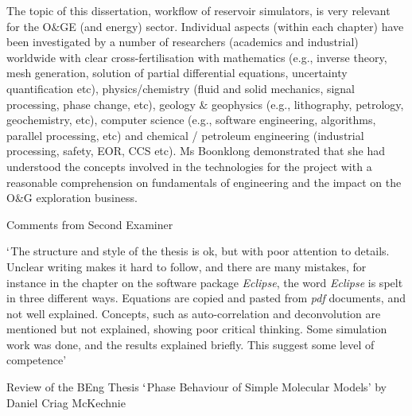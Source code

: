 \documentclass[14pt,twoside]{report}
\begin{document}
The topic of this dissertation, workflow of reservoir simulators, is very relevant for the O$\&$GE (and energy) sector.  Individual aspects (within each chapter) have been investigated by a number of researchers (academics and industrial) worldwide with clear cross-fertilisation with mathematics (e.g., inverse theory, mesh generation, solution of partial differential equations, uncertainty quantification etc), physics/chemistry (fluid and solid mechanics, signal processing, phase change, etc), geology $\&$ geophysics (e.g., lithography, petrology, geochemistry, etc), computer science (e.g., software engineering, algorithms, parallel processing, etc) and chemical / petroleum engineering (industrial processing, safety, EOR, CCS etc). Ms Boonklong  demonstrated that she had understood the concepts involved in the technologies for the project with a reasonable comprehension on fundamentals of engineering and the impact on  the O$\&$G exploration business.   


\bigskip

\noindent
{\large Comments from Second Examiner}

\noindent
$\lq$The structure and style of the thesis is ok, but with poor attention to details. Unclear writing makes it hard to follow, and there are many mistakes, for instance in the chapter on the software package {\it Eclipse}, the word {\it Eclipse} is spelt in three different ways.  Equations are copied and pasted from {\it pdf} documents, and not well explained.  Concepts, such as auto-correlation and deconvolution are mentioned but not explained, showing poor critical thinking. Some simulation work was done, and the results explained briefly. This suggest some level of competence' 



\clearpage



\bigskip

\begin{center}
  {\Large Review of the BEng Thesis $\lq$Phase Behaviour of Simple Molecular Models' by Daniel Criag McKechnie}
\end{center}

\medskip
\end{document}
